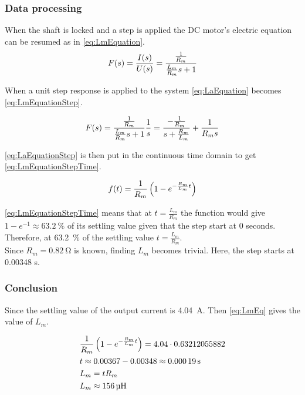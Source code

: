\subsubsection*{Data processing}
When the shaft is locked and a step is applied the DC motor's electric equation can be resumed as in \autoref{eq:LmEquation}.
\begin{equation}
	F(s)=\frac{I(s)}{U(s)}=\frac{\frac{1}{R_m}}{\frac{L_m}{R_m} s+1} \addunit{1}
	\label{eq:LmEquation}
\end{equation}
\startexplain
{}
\stopexplain

When a unit step response is applied to the system \autoref{eq:LaEquation} becomes \autoref{eq:LmEquationStep}.

\begin{equation}
F(s)=\frac{\frac{1}{R_m}}{\frac{L_m}{R_m} s+1}\frac{1}{s}=\frac{-\frac{1}{R_m}}{s+\frac{R_m}{L_m}}+\frac{1}{R_m s} \addunit{1}
\label{eq:LmEquationStep}
\end{equation}

\autoref{eq:LaEquationStep} is then put in the continuous time domain to get \autoref{eq:LmEquationStepTime}.

\begin{equation}
f(t)= \frac{1}{R_m} \left(1-e^{-\frac{R_m}{L_m} t}\right) \addunit{1}
\label{eq:LmEquationStepTime}
\end{equation}

\autoref{eq:LmEquationStepTime} means that at $t=\frac{L_m}{R_m}$ the function would give $1-e^{-1} \approx \SI{63.2}{\percent}$ of its settling value given that the step start at 0 seconds. Therefore, at \SI{63.2}{\percent} of the settling value $t=\frac{L_m}{R_m}$. \\
Since $R_m=\SI{0.82}{\ohm}$ is known, finding $L_m$ becomes trivial. Here, the step starts at 0.00348 s.

\subsubsection*{Conclusion}

Since the settling value of the output current is \SI{4.04}{\ampere}. Then \autoref{eq:LmEq} gives the value of $L_m$.

\begin{subequations} \label{eq:LmEq}
	\begin{flalign}
		&\frac{1}{R_m} \left(1-e^{-\frac{R_m}{L_m} t}\right) = 4.04 \cdot 0.63212055882 \addunit{\second} \\
		&t \approx 0.00367 - 0.00348 \approx \SI{0.00019}{\second} \\
		&L_m=tR_m \\
		&L_m \approx \SI{156}{\micro\henry}
	\end{flalign}
\end{subequations}
